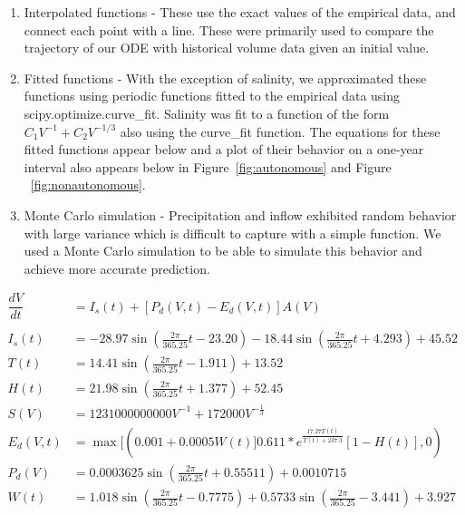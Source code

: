 \documentclass[12pt]{article}
\begin{document}
\begin{enumerate}
\item Interpolated functions - These use the exact values of the empirical data, and connect each point with a line. These were primarily used to compare the trajectory of our ODE with historical volume data given an initial value.
\item Fitted functions - With the exception of salinity, we approximated these functions using periodic functions fitted to the empirical data using scipy.optimize.curve\_fit. Salinity was fit to a function of the form $C_1V^{-1} + C_2V^{-1/3}$ also using the curve\_fit function. The equations for these fitted functions appear below and a plot of their behavior on a one-year interval also appears below in Figure~\ref{fig:autonomous} and Figure ~\ref{fig:nonautonomous}. 
\item Monte Carlo simulation - Precipitation and inflow exhibited random behavior with large variance which is difficult to capture with a simple function. We used a Monte Carlo simulation to be able to simulate this behavior and achieve more accurate prediction.
\end{enumerate}

\begin{equation}
    \begin{aligned}
    \dfrac{dV}{dt} &= I_s(t) + [P_d(V, t) - E_d(V, t)]A(V) \\
    & \\[2ex]
    I_s(t) &= -28.97\sin\left(\frac{2\pi}{365.25}t - 23.20\right) - 18.44\sin\left(\frac{2\pi}{365.25}t + 4.293\right) + 45.52 \\
    T(t) &= 14.41\sin\left(\frac{2\pi}{365.25}t - 1.911\right) + 13.52 \\
    H(t) &= 21.98\sin\left(\frac{2\pi}{365.25}t + 1.377\right) + 52.45 \\
    S(V) &= 1231000000000V^{-1} + 172000V^{-\frac{1}{3}} \\
    E_d(V, t) &= \max[(0.001 + 0.0005W(t)]0.611 * e^{\frac{17.27T(t)}{T(t) + 237.3}}[1 - H(t)], 0)  \\
    P_d(V) &= 0.0003625 \sin\left(\frac{2\pi}{365.25}t + 0.55511\right) + 0.0010715 \\
    W(t) &= 1.018\sin\left(\frac{2\pi}{365.25}t - 0.7775\right) + 0.5733\sin\left(\frac{2\pi}{365.25} - 3.441\right) + 3.927 
\end{aligned}\label{eq:model}
\end{equation}
\end{document}
